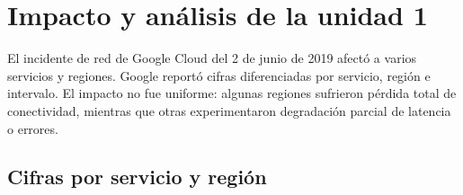 \documentclass[11pt]{article}
\begin{document}
\begingroup
\small
\setlength{\floatsep}{4pt}
\setlength{\textfloatsep}{5pt}
\setlength{\intextsep}{5pt}

\section{Impacto y análisis de la unidad 1}

El incidente de red de Google Cloud del 2 de junio de 2019 afectó a varios servicios y
regiones. Google reportó cifras diferenciadas por servicio, región e intervalo. El impacto no
fue uniforme: algunas regiones sufrieron pérdida total de conectividad, mientras que otras
experimentaron degradación parcial de latencia o errores. \cite{googlecloud19009}

\subsection{Cifras por servicio y región}
\end{document}
